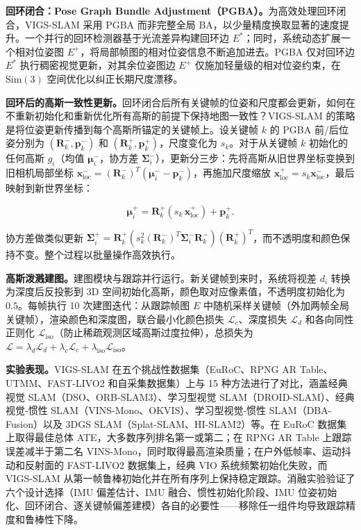 \textbf{回环闭合：Pose Graph Bundle Adjustment（PGBA）。}为高效处理回环闭合，VIGS-SLAM 采用 PGBA 而非完整全局 BA，以少量精度换取显著的速度提升。一个并行的回环检测器基于光流差异构建回环边 $E^*$；同时，系统动态扩展一个相对位姿图 $E^+$，将局部帧图的相对位姿信息不断追加进去。PGBA 仅对回环边 $E^*$ 执行稠密视觉更新，对其余位姿图边 $E^+$ 仅施加轻量级的相对位姿约束，在 $\mathrm{Sim}(3)$ 空间优化以纠正长期尺度漂移。

\textbf{回环后的高斯一致性更新。}回环闭合后所有关键帧的位姿和尺度都会更新，如何在不重新初始化和重新优化所有高斯的前提下保持地图一致性？VIGS-SLAM 的策略是将位姿更新传播到每个高斯所锚定的关键帧上。设关键帧 $k$ 的 PGBA 前/后位姿分别为 $(\mathbf{R}_k^-, \mathbf{p}_k^-)$ 和 $(\mathbf{R}_k^+, \mathbf{p}_k^+)$，尺度变化为 $s_k$。对于从关键帧 $k$ 初始化的任何高斯 $g_i$（均值 $\boldsymbol{\mu}_i^-$，协方差 $\boldsymbol{\Sigma}_i^-$），更新分三步：先将高斯从旧世界坐标变换到旧相机局部坐标 $\mathbf{x}_{\mathrm{loc}}^- = (\mathbf{R}_k^-)^T(\boldsymbol{\mu}_i^- - \mathbf{p}_k^-)$，再施加尺度缩放 $\mathbf{x}_{\mathrm{loc}}^+ = s_k \mathbf{x}_{\mathrm{loc}}^-$，最后映射到新世界坐标：

\begin{equation}
    \boldsymbol{\mu}_i^+ = \mathbf{R}_k^+(s_k\, \mathbf{x}_{\mathrm{loc}}^+) + \mathbf{p}_k^+.
\end{equation}

协方差做类似更新 $\boldsymbol{\Sigma}_i^+ = \mathbf{R}_k^+(s_k^2 (\mathbf{R}_k^-)^T \boldsymbol{\Sigma}_i^- \mathbf{R}_k^-)(\mathbf{R}_k^+)^T$，而不透明度和颜色保持不变。整个过程以批量操作高效执行。

\textbf{高斯泼溅建图。}建图模块与跟踪并行运行。新关键帧到来时，系统将视差 $d_i$ 转换为深度后反投影到 3D 空间初始化高斯，颜色取对应像素值，不透明度初始化为 $0.5$。每帧执行 10 次建图迭代：从跟踪帧图 $E$ 中随机采样关键帧（外加两帧全局关键帧），渲染颜色和深度图，联合最小化颜色损失 $\mathcal{L}_c$、深度损失 $\mathcal{L}_d$ 和各向同性正则化 $\mathcal{L}_{\mathrm{iso}}$（防止稀疏观测区域高斯过度拉伸），总损失为 $\mathcal{L} = \lambda_d \mathcal{L}_d + \lambda_c \mathcal{L}_c + \lambda_{\mathrm{iso}} \mathcal{L}_{\mathrm{iso}}$。

\textbf{实验表现。}VIGS-SLAM 在五个挑战性数据集（EuRoC、RPNG AR Table、UTMM、FAST-LIVO2 和自采集数据集）上与 15 种方法进行了对比，涵盖经典视觉 SLAM（DSO、ORB-SLAM3）、学习型视觉 SLAM（DROID-SLAM）、经典视觉-惯性 SLAM（VINS-Mono、OKVIS）、学习型视觉-惯性 SLAM（DBA-Fusion）以及 3DGS SLAM（Splat-SLAM、HI-SLAM2）等。在 EuRoC 数据集上取得最佳总体 ATE，大多数序列排名第一或第二；在 RPNG AR Table 上跟踪误差减半于第二名 VINS-Mono，同时取得最高渲染质量；在户外低帧率、运动抖动和反射面的 FAST-LIVO2 数据集上，经典 VIO 系统频繁初始化失败，而 VIGS-SLAM 从第一帧鲁棒初始化并在所有序列上保持稳定跟踪。消融实验验证了六个设计选择（IMU 偏差估计、IMU 融合、惯性初始化阶段、IMU 位姿初始化、回环闭合、逐关键帧偏差建模）各自的必要性——移除任一组件均导致跟踪精度和鲁棒性下降。


